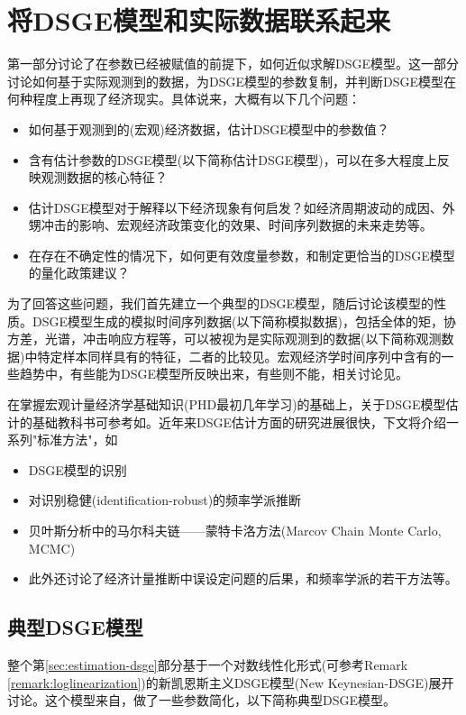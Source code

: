 \chapter{将DSGE模型和实际数据联系起来}
\label{sec:connection}

第一部分讨论了在参数已经被赋值的前提下，如何近似求解DSGE模型。这一部分讨论如何基于实际观测到的数据，为DSGE模型的参数复制，并判断DSGE模型在何种程度上再现了经济现实。具体说来，大概有以下几个问题：
\begin{itemize}
  \item 如何基于观测到的(宏观)经济数据，估计DSGE模型中的参数值？
  \item 含有估计参数的DSGE模型(以下简称估计DSGE模型)，可以在多大程度上反映观测数据的核心特征？
  \item 估计DSGE模型对于解释以下经济现象有何启发？如经济周期波动的成因、外甥冲击的影响、宏观经济政策变化的效果、时间序列数据的未来走势等。
  \item 在存在不确定性的情况下，如何更有效度量参数，和制定更恰当的DSGE模型的量化政策建议？
\end{itemize}

为了回答这些问题，我们首先建立一个典型的DSGE模型，随后讨论该模型的性质。DSGE模型生成的模拟时间序列数据(以下简称模拟数据)，包括全体的矩，协方差，光谱，冲击响应方程等，可以被视为是实际观测到的数据(以下简称观测数据)中特定样本同样具有的特征，二者的比较见。宏观经济学时间序列中含有的一些趋势中，有些能为DSGE模型所反映出来，有些则不能，相关讨论见。

在掌握宏观计量经济学基础知识(PHD最初几年学习)的基础上，关于DSGE模型估计的基础教科书可参考如\cite{Canova:2011vi}。近年来DSGE估计方面的研究进展很快，下文将介绍一系列"标准方法"，如
\begin{itemize}
  \item DSGE模型的识别
  \item 对识别稳健(identification-robust)的频率学派推断
  \item 贝叶斯分析中的马尔科夫链——蒙特卡洛方法(Marcov Chain Monte Carlo, MCMC)\citep{Herbst:2015wh}
  \item 此外还讨论了经济计量推断中误设定问题的后果，和频率学派的若干方法等。
\end{itemize}

\section{典型DSGE模型}
\label{sec:stylized-dsge-model}
整个第\ref{sec:estimation-dsge}部分基于一个对数线性化形式(可参考Remark \ref{remark:loglinearization})的新凯恩斯主义DSGE模型(New Keynesian-DSGE)展开讨论。这个模型来自\cite{DelNegro:2008de}，做了一些参数简化\citep{Smets:2003ic, Christiano:2005ib}，以下简称典型DSGE模型。

